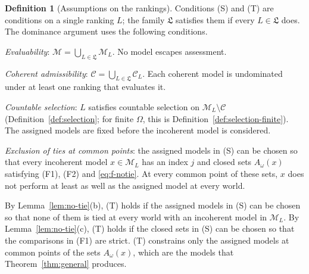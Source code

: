 \documentclass[11pt]{article}
\theoremstyle{definition}
\newtheorem{definition}[theorem]{Definition}
\theoremstyle{remark}
\newcommand{\M}{\mathcal M}
\newcommand{\C}{\mathcal C}
\newcommand{\Lf}{\mathfrak L}
\begin{document}
\begin{definition}[Assumptions on the rankings]\label{def:argument-assumptions}
{\color{red}Conditions (S) and (T)} are conditions on a single ranking $L$; the family $\Lf$ satisfies them if every $L\in\Lf$ does. The dominance argument uses the following conditions.
\begin{itemize}[leftmargin=3.4em,labelsep=0.5em]
\item[\textbf{(E)}] \emph{Evaluability}: $\M=\bigcup_{L\in\Lf}\M_L$. No model escapes assessment.
\item[\textbf{(A)}] \emph{Coherent admissibility}: $\C=\bigcup_{L\in\Lf}\C_L$. Each coherent model is undominated under at least one ranking that evaluates it.
\item[\textbf{{\color{red}(S)}}] \emph{Countable selection}: $L$ satisfies countable selection on $\M_L\setminus\C$ (Definition~\ref{def:selection}{\color{red}; for finite $\Omega$, this is Definition~\ref{def:selection-finite}}). {\color{red}The assigned models} are fixed before the incoherent model is considered.
{\color{red}\item[\textbf{(T)}] \emph{Exclusion of ties at common points}: the assigned models in (S) can be chosen so that every incoherent model $x\in\M_L$ has an index $j$ and closed sets $A_\omega(x)$ satisfying (F1), (F2) and \eqref{eq:f-notie}. At every common point of these sets, $x$ does not perform at least as well as the assigned model at every world.}
\end{itemize}
{\color{red}By Lemma~\ref{lem:no-tie}(b), (T) holds if the assigned models in (S) can be chosen so that none of them is tied at every world with an incoherent model in $\M_L$. By Lemma~\ref{lem:no-tie}(c), (T) holds if the closed sets in (S) can be chosen so that the comparisons in (F1) are strict. (T) constrains only the assigned models at common points of the sets $A_\omega(x)$, which are the models that Theorem~\ref{thm:general} produces.}
\end{definition}
\end{document}
